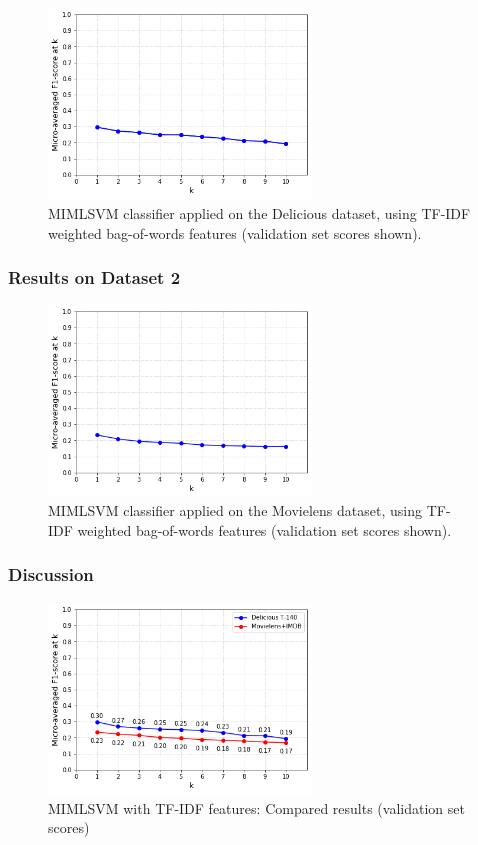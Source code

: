 \begin{figure}[H]
    \centering
    \includegraphics[width=7cm]{chapters/05_experiments/images/delicious-mimlsvm-tfidf.png}
    \caption{MIMLSVM classifier applied on the Delicious dataset, using TF-IDF weighted bag-of-words features  (validation set scores shown).}
    \label{fig:mimlsvm_delicious_tfidf}
\end{figure}

\subsubsection{Results on Dataset 2}

\begin{figure}[H]
    \centering
    \includegraphics[width=7cm]{chapters/05_experiments/images/mimlsvm-tf-idf-movielens.png}
    \caption{MIMLSVM classifier applied on the Movielens dataset, using TF-IDF weighted bag-of-words features (validation set scores shown).}
    \label{fig:mimlsvm_movielens_tfidf}
\end{figure}

\subsubsection{Discussion}

\begin{figure}[H]
    \centering
    \includegraphics[width=7cm]{chapters/05_experiments/images/proposal-2-compared-1.png}
    \caption{MIMLSVM with TF-IDF features: Compared results (validation set scores)}
    \label{fig:compared_mimlsvm_tfidf}
\end{figure}

